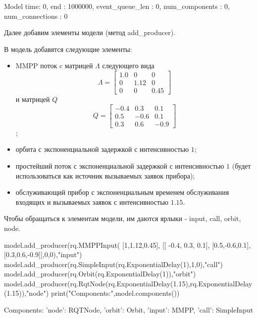 \begin{pyout}
	Model{ time: 0, end : 1000000, event_queue_len : 0, num_components : 0, num_connections : 0 }
\end{pyout}

Далее добавим элементы модели (метод add\_producer). 

В модель добавятся следующие элементы: 
\begin{itemize}
	\item MMPP поток c матрицей $\Lambda$ следующего вида
		\begin{equation*}
			\Lambda =  \begin{bmatrix}
			1.0 & 0 &  0\\
			0 & 1.12 & 0\\
			0 & 0 &	0.45
			\end{bmatrix}
		\end{equation*} и матрицей $Q$
		\begin{equation*}
			Q =  \begin{bmatrix}
				-0.4 & 0.3 &  0.1\\
				0.5 & -0.6 & 0.1\\
				0.3 & 0.6 &	-0.9
			\end{bmatrix}
		\end{equation*};
	\item орбита с экспоненциальной задержкой с интенсивностью $1$;
	\item простейший поток с экспоненциальной задержкой с интенсивностью $1$ (будет использоваться как источник вызываемых заявок прибора);
	\item обслуживающий прибор с экспоненциальным временем обслуживания входящих и вызываемых заявок с интенсивностью $1.15$.
\end{itemize}
Чтобы обращаться к элементам модели, им даются ярлыки - input, call, orbit, node.


\begin{pyin}
model.add_producer(rq.MMPPInput(
[1,1.12,0.45],
[[ -0.4, 0.3, 0.1],
[0.5,-0.6,0.1],
[0.3,0.6,-0.9]],0,0),"input")
model.add_producer(rq.SimpleInput(rq.ExponentialDelay(1),1,0),"call")
model.add_producer(rq.Orbit(rq.ExponentialDelay(1)),"orbit")
model.add_producer(rq.RqtNode(rq.ExponentialDelay(1.15),rq.ExponentialDelay(1.15)),"node")
print("Components:",model.components())
\end{pyin}

\begin{pyout}
	Components: {'node': RQTNode, 'orbit': Orbit, 'input': MMPP, 'call': SimpleInput}
\end{pyout}

